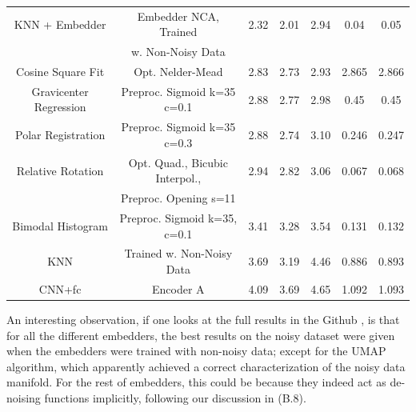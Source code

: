 \documentclass[11pt, a4paper, twoside]{article} %
\begin{document}
\begin{table}[h!]
\begin{tabular}{c|c|c|cc|cc}
           KNN + Embedder & Embedder NCA, Trained  &  2.32 &       2.01 &      2.94 &         0.04 &        0.05 \\ 
                    &         w. Non-Noisy Data   &       &            &           &              &             \\ \hline
        \rule{0pt}{4mm}{}Cosine Square Fit &                        Opt. Nelder-Mead &  2.83 &       2.73 &      2.93 &         2.865 &        2.866 \\ \hline
   \rule{0pt}{4mm}{}Gravicenter Regression &             Preproc. Sigmoid k=35 c=0.1 &  2.88 &       2.77 &      2.98 &         0.45 &        0.45 \\ \hline
       \rule{0pt}{4mm}{}Polar Registration &             Preproc. Sigmoid k=35 c=0.3 &  2.88 &       2.74 &      3.10 &         0.246 &        0.247 \\ \hline
        \rule{0pt}{4mm}{}Relative Rotation &         Opt. Quad., Bicubic Interpol.,  &  2.94 &       2.82 &      3.06 &         0.067 &        0.068 \\ 
                          &                   Preproc. Opening s=11 &       &            &           &              &             \\ \hline
        \rule{0pt}{4mm}{}Bimodal Histogram &            Preproc. Sigmoid k=35, c=0.1 &  3.41 &       3.28 &      3.54 &         0.131 &        0.132 \\ \hline
                   \rule{0pt}{4mm}{}
                   
KNN & Trained w. Non-Noisy Data & 3.69 &	3.19 &	4.46 &	0.886 &	0.893 \\ \hline\rule{0pt}{4mm}{}                   
                   
                   CNN+fc &                               Encoder A &  4.09 &       3.69 &      4.65 &         1.092 &        1.093 \\
\bottomrule
\end{tabular}

\end{table}

An interesting observation, if one looks at the full results in the Github \cite{github}, is that for all the different embedders, the best results on the noisy dataset were given when the embedders were trained with non-noisy data; except for the UMAP algorithm, which apparently achieved a correct characterization of the noisy data manifold. For the rest of embedders, this could be because they indeed act as de-noising functions implicitly, following our discussion in (B.8). 
\end{document}
